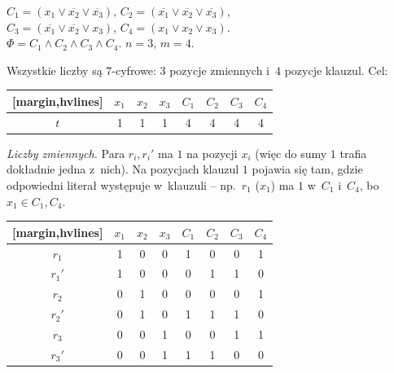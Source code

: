 \begin{example}
	$C_1 = (x_1 \vee \overline{x_2} \vee \overline{x_3})$, \quad $C_2 = (\overline{x_1} \vee \overline{x_2} \vee \overline{x_3})$,\\
	$C_3 = (\overline{x_1} \vee \overline{x_2} \vee x_3)$, \quad $C_4 = (x_1 \vee x_2 \vee x_3)$.\\
	$\Phi = C_1 \wedge C_2 \wedge C_3 \wedge C_4$. \quad $n = 3$, $m = 4$.

	Wszystkie liczby są $7$-cyfrowe: $3$ pozycje zmiennych i~$4$ pozycje klauzul. Cel:
	\begin{aztable}
		\centering
		\renewcommand{\arraystretch}{1.2}
		\begin{NiceTabular}{c|ccc|cccc}[margin,hvlines]
			    & $x_1$ & $x_2$ & $x_3$ & $C_1$ & $C_2$ & $C_3$ & $C_4$ \\
			\hline
			$t$ & 1     & 1     & 1     & 4     & 4     & 4     & 4     \\
		\end{NiceTabular}
	\end{aztable}

	\emph{Liczby zmiennych.} Para $r_i, r_i'$ ma $1$ na pozycji $x_i$ (więc do sumy $1$ trafia dokładnie jedna z~nich). Na pozycjach klauzul $1$ pojawia się tam, gdzie odpowiedni literał występuje w~klauzuli -- np.\ $r_1$ ($x_1$) ma $1$ w~$C_1$ i~$C_4$, bo $x_1 \in C_1, C_4$.
	\begin{aztable}
		\centering
		\renewcommand{\arraystretch}{1.2}
		\begin{NiceTabular}{c|ccc|cccc}[margin,hvlines]
			       & $x_1$ & $x_2$ & $x_3$ & $C_1$ & $C_2$ & $C_3$ & $C_4$ \\
			\hline
			$r_1$  & 1     & 0     & 0     & 1     & 0     & 0     & 1     \\
			$r_1'$ & 1     & 0     & 0     & 0     & 1     & 1     & 0     \\
			$r_2$  & 0     & 1     & 0     & 0     & 0     & 0     & 1     \\
			$r_2'$ & 0     & 1     & 0     & 1     & 1     & 1     & 0     \\
			$r_3$  & 0     & 0     & 1     & 0     & 0     & 1     & 1     \\
			$r_3'$ & 0     & 0     & 1     & 1     & 1     & 0     & 0     \\
		\end{NiceTabular}
	\end{aztable}


\end{example}

